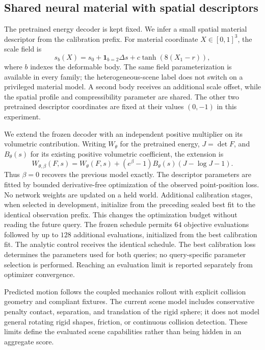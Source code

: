\subsection{Shared neural material with spatial descriptors}
The pretrained energy decoder is kept fixed. We infer a small spatial
material descriptor from the calibration prefix. For material coordinate
$X\in[0,1]^3$, the scale field is
\begin{equation}
 s_b(X)=s_0+\mathbf{1}_{b=2}\Delta s+
 c\tanh\!\left(8(X_1-r)\right),
\end{equation}
where $b$ indexes the deformable body. The same field parameterization is
available in every family; the heterogeneous-scene label does not switch
on a privileged material model. A second body receives an additional scale
offset, while the spatial profile and compressibility parameter are shared.
The other two pretrained descriptor coordinates are fixed at their
values $(0,-1)$ in this experiment.

We extend the frozen decoder with an independent positive multiplier on
its volumetric contribution. Writing $W_\theta$ for the pretrained energy,
$J=\det F$, and $B_\theta(s)$ for its existing positive volumetric
coefficient, the extension is
\begin{equation}
 W_{\theta,\beta}(F,s)=W_\theta(F,s)
 +(e^\beta-1)B_\theta(s)(J-\log J-1).
\end{equation}
Thus $\beta=0$ recovers the previous model exactly. The descriptor parameters
are fitted by bounded derivative-free optimization of the observed
point-position loss. No network weights are updated on a held world.
Additional calibration stages, when selected in development, initialize
from the preceding sealed best fit to the identical observation prefix.
This changes the optimization budget without reading the future query.
The frozen schedule permits $64$ objective evaluations followed by up to
$128$ additional evaluations, initialized from the best calibration fit.
The analytic control receives the identical schedule. The best calibration
loss determines the parameters used for both queries; no query-specific
parameter selection is performed. Reaching an evaluation limit is reported
separately from optimizer convergence.

Predicted motion follows the coupled mechanics rollout with explicit
collision geometry and compliant fixtures. The current scene model includes
conservative penalty contact, separation, and translation of the rigid
sphere; it does not model general rotating rigid shapes, friction, or
continuous collision detection. These limits define the evaluated scene
capabilities rather than being hidden in an aggregate score.


